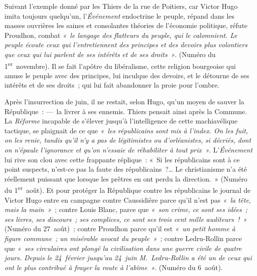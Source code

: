 \documentclass[french,twoside]{book} %
\begin{document}
Suivant l’exemple donné par les Thiers de la rue de Poitiers, car Victor Hugo imita toujours quelqu’un, l’\emph{Événement} endoctrine le peuple, répand  
\label{p29}dans les masses ouvrières les saines et consolantes théories de l’économie politique, réfute Proudhon, combat \emph{« le langage des flatteurs du peuple, qui le calomnient. Le peuple écoute ceux qui l’entretiennent des principes et des devoirs plus volontiers que ceux qui lui parlent de ses intérêts et de ses droits »}. (Numéro du 1\textsuperscript{er} novembre). Il se fait l’apôtre du libéralisme, cette religion bourgeoise qui amuse le peuple avec des principes, lui inculque des devoirs, et le détourne de ses intérêts et de ses droits ; qui lui fait abandonner la proie pour l’ombre.\par
Après l’insurrection de juin, il ne restait, selon Hugo, qu’un moyen de sauver la République : — la livrer à ses ennemis. Thiers pensait ainsi après la Commune. La \emph{Réforme} incapable de s’élever jusqu’à l’intelligence de cette machiavélique tactique, se plaignait de ce que \emph{« les républicains sont mis à l’index. On les fuit, on les renie, tandis qu’il n’y a pas de légitimistes ou d’orléanistes, si décriés, dont on n’épaule l’ignorance et qu’on n’essaie de réhabiliter à tout prix »}. L’\emph{Événement} lui rive son clou avec cette frappante réplique : « Si les républicains sont à ce point suspects, n’est-ce pas la faute des républicains ?… Le christianisme n’a été réellement puissant que lorsque les prêtres en ont perdu la direction. » (Numéro du 1\textsuperscript{er} août). Et pour protéger la République contre les républicains le journal de Victor Hugo entre en campagne contre Caussidière parce qu’il n’est pas \emph{« la tête, mais la main »} ; contre Louis Blanc, parce que \emph{« son crime, ce sont ses idées ; ses livres, ses discours ; ses complices, ce  
\label{p30}sont ses trois cent mille auditeurs ! »} (Numéro du 27 août) ; contre Proudhon parce qu’il est \emph{« un petit homme à figure commune ; un misérable avocat du peuple »} ; contre Ledru-Rollin parce que \emph{« ses circulaires ont plongé la civilisation dans une guerre civile de quatre jours. Depuis le 24 février jusqu’au 24 juin M. Ledru-Rollin a été un de ceux qui ont le plus contribué à frayer la route à l’abîme »}. (Numéro du 6 août).\par
\end{document}
